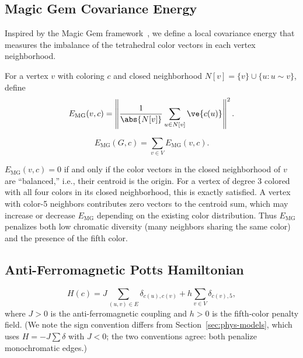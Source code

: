 \subsection{Magic Gem Covariance Energy}\label{sec:mg-energy}

Inspired by the Magic Gem framework~\cite{mathewson2025}, we define a
local covariance energy that measures the imbalance of the tetrahedral
color vectors in each vertex neighborhood.

\begin{definition}\label{def:mg-local}
For a vertex $v$ with coloring $c$ and closed neighborhood
$N[v] = \{v\} \cup \{u : u \sim v\}$, define
\begin{equation}\label{eq:mg-local}
  E_{\mathrm{MG}}(v, c) =
  \left\lVert
    \frac{1}{\abs{N[v]}} \sum_{u \in N[v]} \ve{c(u)}
  \right\rVert^2.
\end{equation}
\end{definition}

\begin{definition}\label{def:mg-global}
\begin{equation}\label{eq:mg-global}
  E_{\mathrm{MG}}(G, c) = \sum_{v \in V} E_{\mathrm{MG}}(v, c).
\end{equation}
\end{definition}

\begin{remark}\label{rem:mg-interp}
$E_{\mathrm{MG}}(v, c) = 0$ if and only if the color vectors in the
closed neighborhood of $v$ are ``balanced,'' i.e., their centroid is
the origin. For a vertex of degree 3 colored with all four colors in
its closed neighborhood, this is exactly satisfied. A vertex with
color-5 neighbors contributes zero vectors to the
centroid sum, which may increase or decrease $E_{\mathrm{MG}}$
depending on the existing color distribution. Thus $E_{\mathrm{MG}}$
penalizes both low chromatic diversity
(many neighbors sharing the same color) and the presence of the fifth
color.
\end{remark}

\subsection{Anti-Ferromagnetic Potts Hamiltonian}\label{sec:potts}

\begin{definition}\label{def:potts-ham}
\begin{equation}\label{eq:potts-ham}
  H(c) = J \sum_{(u,v) \in E} \delta_{c(u), c(v)}
         + h \sum_{v \in V} \delta_{c(v), 5},
\end{equation}
where $J > 0$ is the anti-ferromagnetic coupling and $h > 0$ is the
fifth-color penalty field. (We note the sign convention differs from
Section~\ref{sec:phys-models}, which uses $H = -J\sum\delta$ with
$J < 0$; the two conventions agree: both penalize monochromatic edges.)
\end{definition}

